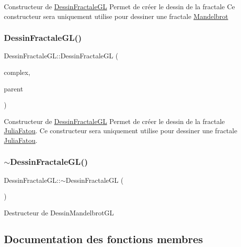 Constructeur de \hyperlink{classDessinFractaleGL}{Dessin\+Fractale\+GL} Permet de créer le dessin de la fractale Ce constructeur sera uniquement utilise pour dessiner une fractale \hyperlink{classMandelbrot}{Mandelbrot} \mbox{\label{classDessinFractaleGL_a5a2c37ded5cee601b0b3fec8a1076ee4}} 
\subsubsection{\texorpdfstring{Dessin\+Fractale\+G\+L()}{DessinFractaleGL()}\hspace{0.1cm}{\footnotesize\ttfamily [2/2]}}
{\footnotesize\ttfamily Dessin\+Fractale\+G\+L\+::\+Dessin\+Fractale\+GL (\begin{DoxyParamCaption}\item[{\hyperlink{classComplex}{Complex} \&}]{complex,  }\item[{Q\+Widget $\ast$}]{parent }\end{DoxyParamCaption})}

Constructeur de \hyperlink{classDessinFractaleGL}{Dessin\+Fractale\+GL} Permet de créer le dessin de la fractale \hyperlink{classJuliaFatou}{Julia\+Fatou}. Ce constructeur sera uniquement utilise pour dessiner une fractale \hyperlink{classJuliaFatou}{Julia\+Fatou}. \mbox{\label{classDessinFractaleGL_a9b65d2d37f9b8c615713b9d0cd1b15d3}} 
\subsubsection{\texorpdfstring{$\sim$\+Dessin\+Fractale\+G\+L()}{~DessinFractaleGL()}}
{\footnotesize\ttfamily Dessin\+Fractale\+G\+L\+::$\sim$\+Dessin\+Fractale\+GL (\begin{DoxyParamCaption}{ }\end{DoxyParamCaption})}

Destructeur de Dessin\+Mandelbrot\+GL 

\subsection{Documentation des fonctions membres}
\mbox{\label{classDessinFractaleGL_a1c8787f969da8312ba3dbaa82f09ec5a}} 

